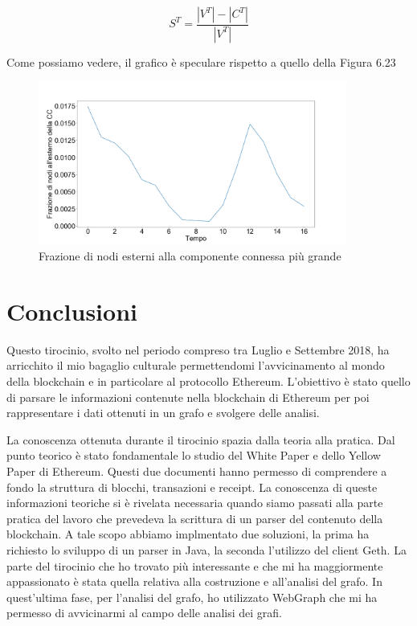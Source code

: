 \documentclass[12pt]{report}
\begin{document}
\begin{equation}
    S^T = \frac{|V^T| - |C^T|}{|V^T|}
\end{equation}

\newline
Come possiamo vedere, il grafico è speculare rispetto a quello della Figura 6.23

\begin{figure}[H]
    \centering\includegraphics[width=0.9\textwidth]{GiantCCSpeculare.png}
    \caption{Frazione di nodi esterni alla componente connessa più grande}
\end{figure}

\chapter{Conclusioni}

Questo tirocinio, svolto nel periodo compreso tra Luglio e Settembre 2018, ha arricchito il mio bagaglio culturale permettendomi l'avvicinamento al mondo della blockchain e in particolare al protocollo Ethereum.
L'obiettivo è stato quello di parsare le informazioni contenute nella blockchain di Ethereum per poi rappresentare i dati ottenuti in un grafo e svolgere delle analisi.

La conoscenza ottenuta durante il tirocinio spazia dalla teoria alla pratica.
\newline
Dal punto teorico è stato fondamentale lo studio del White Paper e dello Yellow Paper di Ethereum. Questi due documenti hanno permesso di comprendere a fondo la struttura di blocchi, transazioni e receipt.
La conoscenza di queste informazioni teoriche si è rivelata necessaria quando siamo passati alla parte pratica del lavoro che prevedeva la scrittura di un parser del contenuto della blockchain. A tale scopo abbiamo implmentato due soluzioni, la prima ha richiesto lo sviluppo di un parser in Java, la seconda l'utilizzo del client Geth.
La parte del tirocinio che ho trovato più interessante e che mi ha maggiormente appassionato è stata quella relativa alla costruzione e all'analisi del grafo.
In quest'ultima fase, per l'analisi del grafo, ho utilizzato WebGraph che mi ha permesso di avvicinarmi al campo delle analisi dei grafi.
\end{document}
